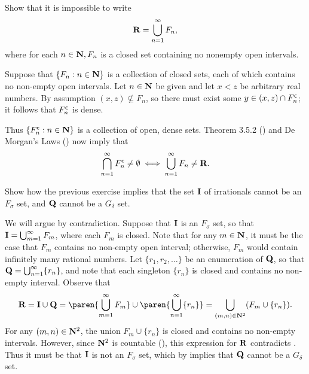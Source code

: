\documentclass{lew98_solutions}
\begin{document}
\begin{exercise}
\label{ex:3.5.5}
    Show that it is impossible to write
    \[
        \mathbf{R} = \bigcup_{n=1}^{\infty} F_n,
    \]
    where for each \( n \in \mathbf{N}, F_n \) is a closed set containing no nonempty open intervals.
\end{exercise}

\begin{solution}
    Suppose that \( \{ F_n : n \in \mathbf{N} \} \) is a collection of closed sets, each of which contains no non-empty open intervals. Let \( n \in \mathbf{N} \) be given and let \( x < z \) be arbitrary real numbers. By assumption \( (x, z) \not\subseteq F_n \), so there must exist some \( y \in (x, z) \cap F_n^{\mathsf{c}} \); it follows that \( F_n^{\mathsf{c}} \) is dense.

    Thus \( \{ F_n^{\mathsf{c}} : n \in \mathbf{N} \} \) is a collection of open, dense sets. Theorem 3.5.2 () and De Morgan's Laws () now imply that
    \[
        \bigcap_{n=1}^{\infty} F_n^{\mathsf{c}} \neq \emptyset \iff \bigcup_{n=1}^{\infty} F_n \neq \mathbf{R}.
    \]
\end{solution}

\begin{exercise}
\label{ex:3.5.6}
    Show how the previous exercise implies that the set \( \mathbf{I} \) of irrationals cannot be an \( F_{\sigma} \) set, and \( \mathbf{Q} \) cannot be a \( G_{\delta} \) set.
\end{exercise}

\begin{solution}
    We will argue by contradiction. Suppose that \( \mathbf{I} \) is an \( F_{\sigma} \) set, so that \( \mathbf{I} = \bigcup_{m=1}^{\infty} F_m \), where each \( F_m \) is closed. Note that for any \( m \in \mathbf{N} \), it must be the case that \( F_m \) contains no non-empty open interval; otherwise, \( F_m \) would contain infinitely many rational numbers. Let \( \{ r_1, r_2, \ldots \} \) be an enumeration of \( \mathbf{Q} \), so that \( \mathbf{Q} = \bigcup_{n=1}^{\infty} \{ r_n \} \), and note that each singleton \( \{ r_n \} \) is closed and contains no non-empty interval. Observe that
    \[
        \R = \I \cup \Q = \paren{ \bigcup_{m=1}^{\infty} F_m } \cup \paren{ \bigcup_{n=1}^{\infty} \{ r_n \} } = \bigcup_{(m, n) \in \N^2} (F_m \cup \{ r_n \}).
    \]
    For any \( (m, n) \in \mathbf{N}^2 \), the union \( F_m \cup \{ r_n \} \) is closed and contains no non-empty intervals. However, since \( \mathbf{N}^2 \) is countable (), this expression for \( \mathbf{R} \) contradicts . Thus it must be that \( \mathbf{I} \) is not an \( F_{\sigma} \) set, which by  implies that \( \mathbf{Q} \) cannot be a \( G_{\delta} \) set.
\end{solution}
\end{document}
